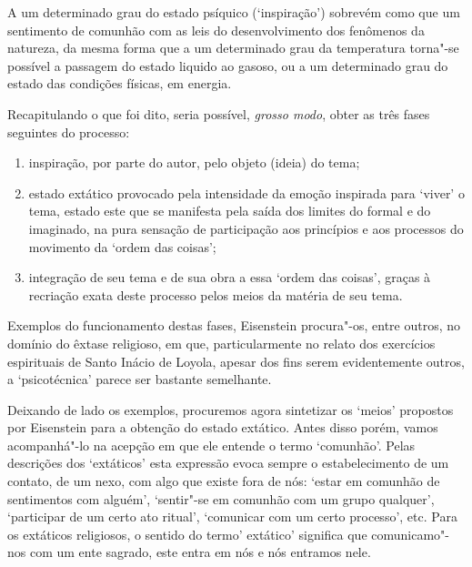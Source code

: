 A um determinado grau do estado psíquico (`inspiração') sobrevém como
que um sentimento de comunhão com as leis do desenvolvimento dos
fenômenos da natureza, da mesma forma que a um determinado grau da
temperatura torna"-se possível a passagem do estado liquido ao gasoso, ou
a um determinado grau do estado das condições físicas, em energia.

Recapitulando o que foi dito, seria possível, \emph{grosso modo}, obter
as três fases seguintes do processo:

\begin{enumerate}
\def\labelenumi{\arabic{enumi})}
\item
  inspiração, por parte do autor, pelo objeto (ideia) do tema;
\item
  estado extático provocado pela intensidade da emoção inspirada para
`viver' o tema, estado este que se manifesta pela saída dos limites do
formal e do imaginado, na pura sensação de participação aos princípios e
aos processos do movimento da `ordem das coisas';
\item
  integração de seu tema e de sua obra a essa `ordem das coisas',
graças à recriação exata deste processo pelos meios da matéria de seu
tema.
\end{enumerate}

Exemplos do funcionamento destas fases, Eisenstein procura"-os, entre
outros, no domínio do êxtase religioso, em que, particularmente no
relato dos exercícios espirituais de Santo Inácio de Loyola, apesar dos
fins serem evidentemente outros, a `psicotécnica' parece ser bastante
semelhante.

Deixando de lado os exemplos, procuremos agora sintetizar os `meios'
propostos por Eisenstein para a obtenção do estado extático. Antes disso
porém, vamos acompanhá"-lo na acepção em que ele entende o termo
`comunhão'. Pelas descrições dos `extáticos' esta expressão evoca sempre
o estabelecimento de um contato, de um nexo, com algo que existe fora de
nós: `estar em comunhão de sentimentos com alguém', `sentir"-se em
comunhão com um grupo qualquer', `participar de um certo ato ritual',
`comunicar com um certo processo', etc. Para os extáticos religiosos, o
sentido do termo' extático' significa que comunicamo"-nos com um ente
sagrado, este entra em nós e nós entramos nele.

